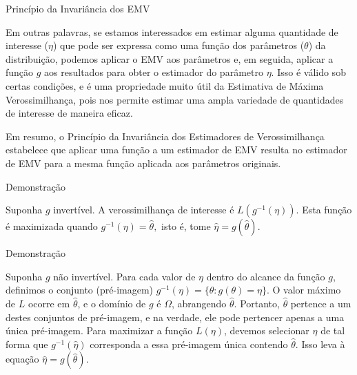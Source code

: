 \documentclass[12pt]{beamer}
\begin{document}
\begin{frame}{Princípio da Invariância dos EMV}
\begin{block}{}
\justifying
Em outras palavras, se estamos interessados em estimar alguma quantidade de interesse (\(\eta\)) que pode ser expressa como uma função dos parâmetros (\(\theta\)) da distribuição, podemos aplicar o EMV aos parâmetros e, em seguida, aplicar a função \(g\) aos resultados para obter o estimador do parâmetro \(\eta\). Isso é válido sob certas condições, e é uma propriedade muito útil da Estimativa de Máxima Verossimilhança, pois nos permite estimar uma ampla variedade de quantidades de interesse de maneira eficaz.
\end{block}
\pause
\begin{block}{}
\justifying
Em resumo, o Princípio da Invariância dos Estimadores de Verossimilhança estabelece que aplicar uma função a um estimador de EMV resulta no estimador de EMV para a mesma função aplicada aos parâmetros originais.
\end{block}
\end{frame}

\begin{frame}{Demonstração}
\begin{block}{}
\justifying
Suponha $g$ invertível. A verossimilhança de interesse é $L(g^{-1}(\eta)).$ Esta função é maximizada quando $g^{-1}(\eta)=\hat{\theta},$ isto é, tome $\hat{\eta}=g(\hat{\theta}).$
\end{block}
\end{frame}

\begin{frame}{Demonstração}
\begin{block}{}
\justifying
Suponha $g$ não invertível. Para cada valor de \(\eta\) dentro do alcance da função \(g\), definimos o conjunto (pré-imagem) \(g^{-1}(\eta) = \{\theta : g(\theta) = \eta\}\). O valor máximo de \(L\) ocorre em \(\hat{\theta}\), e o domínio de \(g\) é \(\Omega\), abrangendo \(\hat{\theta}\). Portanto, \(\hat{\theta}\) pertence a um destes conjuntos de pré-imagem, e na verdade, ele pode pertencer apenas a uma única pré-imagem. Para maximizar a função \(L(\eta)\), devemos selecionar \(\hat{\eta}\) de tal forma que \(g^{-1}(\hat{\eta})\) corresponda a essa pré-imagem única contendo \(\hat{\theta}\). Isso leva à equação \(\hat{\eta} = g(\hat{\theta})\).
\end{block}
\end{frame}
\end{document}

